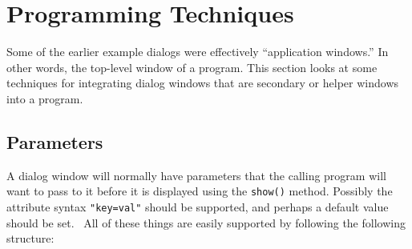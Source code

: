 \section{Programming Techniques}

Some of the earlier example dialogs were effectively
``application windows.'' In other words, the
top-level window of a program. This section looks at some techniques
for integrating dialog windows that are secondary or helper windows
into a program.

\subsection*{Parameters}

A dialog window will normally have parameters that the calling program will want
to pass to it before it is displayed using the \texttt{show()} method. Possibly
the attribute syntax \texttt{"key=val"} should be
supported, and perhaps a default value should be set. \ All of these things are
easily supported by following the following structure:


